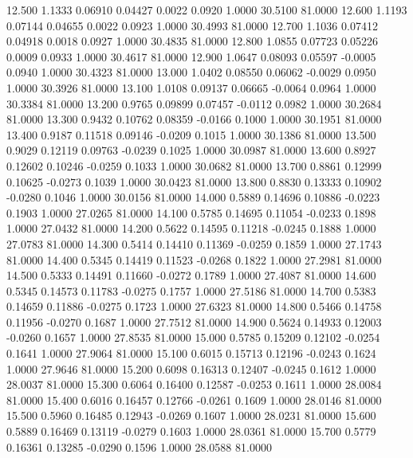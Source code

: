   12.500   1.1333   0.06910   0.04427   0.0022   0.0920   1.0000  30.5100  81.0000
  12.600   1.1193   0.07144   0.04655   0.0022   0.0923   1.0000  30.4993  81.0000
  12.700   1.1036   0.07412   0.04918   0.0018   0.0927   1.0000  30.4835  81.0000
  12.800   1.0855   0.07723   0.05226   0.0009   0.0933   1.0000  30.4617  81.0000
  12.900   1.0647   0.08093   0.05597  -0.0005   0.0940   1.0000  30.4323  81.0000
  13.000   1.0402   0.08550   0.06062  -0.0029   0.0950   1.0000  30.3926  81.0000
  13.100   1.0108   0.09137   0.06665  -0.0064   0.0964   1.0000  30.3384  81.0000
  13.200   0.9765   0.09899   0.07457  -0.0112   0.0982   1.0000  30.2684  81.0000
  13.300   0.9432   0.10762   0.08359  -0.0166   0.1000   1.0000  30.1951  81.0000
  13.400   0.9187   0.11518   0.09146  -0.0209   0.1015   1.0000  30.1386  81.0000
  13.500   0.9029   0.12119   0.09763  -0.0239   0.1025   1.0000  30.0987  81.0000
  13.600   0.8927   0.12602   0.10246  -0.0259   0.1033   1.0000  30.0682  81.0000
  13.700   0.8861   0.12999   0.10625  -0.0273   0.1039   1.0000  30.0423  81.0000
  13.800   0.8830   0.13333   0.10902  -0.0280   0.1046   1.0000  30.0156  81.0000
  14.000   0.5889   0.14696   0.10886  -0.0223   0.1903   1.0000  27.0265  81.0000
  14.100   0.5785   0.14695   0.11054  -0.0233   0.1898   1.0000  27.0432  81.0000
  14.200   0.5622   0.14595   0.11218  -0.0245   0.1888   1.0000  27.0783  81.0000
  14.300   0.5414   0.14410   0.11369  -0.0259   0.1859   1.0000  27.1743  81.0000
  14.400   0.5345   0.14419   0.11523  -0.0268   0.1822   1.0000  27.2981  81.0000
  14.500   0.5333   0.14491   0.11660  -0.0272   0.1789   1.0000  27.4087  81.0000
  14.600   0.5345   0.14573   0.11783  -0.0275   0.1757   1.0000  27.5186  81.0000
  14.700   0.5383   0.14659   0.11886  -0.0275   0.1723   1.0000  27.6323  81.0000
  14.800   0.5466   0.14758   0.11956  -0.0270   0.1687   1.0000  27.7512  81.0000
  14.900   0.5624   0.14933   0.12003  -0.0260   0.1657   1.0000  27.8535  81.0000
  15.000   0.5785   0.15209   0.12102  -0.0254   0.1641   1.0000  27.9064  81.0000
  15.100   0.6015   0.15713   0.12196  -0.0243   0.1624   1.0000  27.9646  81.0000
  15.200   0.6098   0.16313   0.12407  -0.0245   0.1612   1.0000  28.0037  81.0000
  15.300   0.6064   0.16400   0.12587  -0.0253   0.1611   1.0000  28.0084  81.0000
  15.400   0.6016   0.16457   0.12766  -0.0261   0.1609   1.0000  28.0146  81.0000
  15.500   0.5960   0.16485   0.12943  -0.0269   0.1607   1.0000  28.0231  81.0000
  15.600   0.5889   0.16469   0.13119  -0.0279   0.1603   1.0000  28.0361  81.0000
  15.700   0.5779   0.16361   0.13285  -0.0290   0.1596   1.0000  28.0588  81.0000

